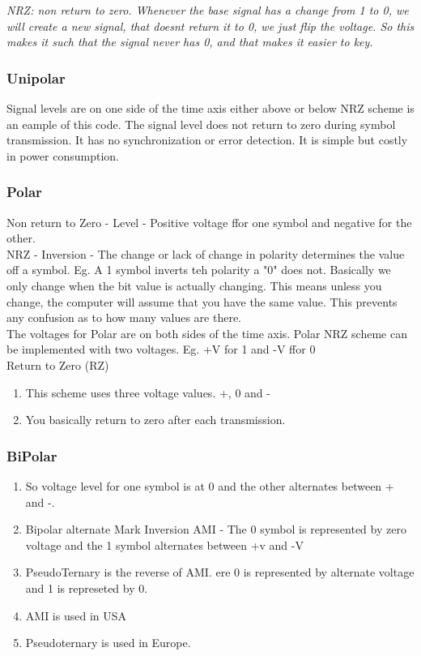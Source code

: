 \documentclass[11pt]{article}
\begin{document}
\textit{NRZ: non return to zero. Whenever the base signal has a change from 1 to 0, we will create a new signal, that doesnt return it to 0, we just flip the voltage. So this makes it such that the signal never has 0, and that makes it easier to key.
}


\subsubsection{Unipolar}
Signal levels are on one side of the time axis either above or below NRZ scheme is an eample of this code. The signal level does not return to zero during symbol transmission. It has no synchronization or error detection. It is simple but costly in power consumption. 

\subsubsection{Polar}

Non return to Zero - Level - Positive voltage ffor one symbol and negative for the other. \\

NRZ - Inversion - The change or lack of change in polarity determines the value off a symbol. Eg. A 1 symbol inverts teh polarity a "0" does not. Basically we only change when the bit value is actually changing. This means unless you change, the computer will assume that you have the same value. This prevents any confusion as to how many values are there.\\  

The voltages for Polar are on both sides of the time axis. Polar NRZ scheme can be implemented with two voltages. Eg. +V for 1 and -V ffor 0\\

Return to Zero (RZ)
\begin{enumerate}
	\item This scheme uses three voltage values. +, 0 and -
	\item You basically return to zero after each transmission. 
\end{enumerate}

\subsubsection{BiPolar}
\begin{enumerate}
	\item So voltage level for one symbol is at 0 and the other alternates between + and -.
	\item Bipolar alternate Mark Inversion AMI - The 0 symbol is represented by zero voltage and the 1 symbol alternates between +v and -V
	\item PseudoTernary is the reverse of AMI. ere 0 is represented by alternate voltage and 1 is represeted by 0. 
	\item AMI is used in USA
	\item Pseudoternary is used in Europe. 
\end{enumerate}
\end{document}
